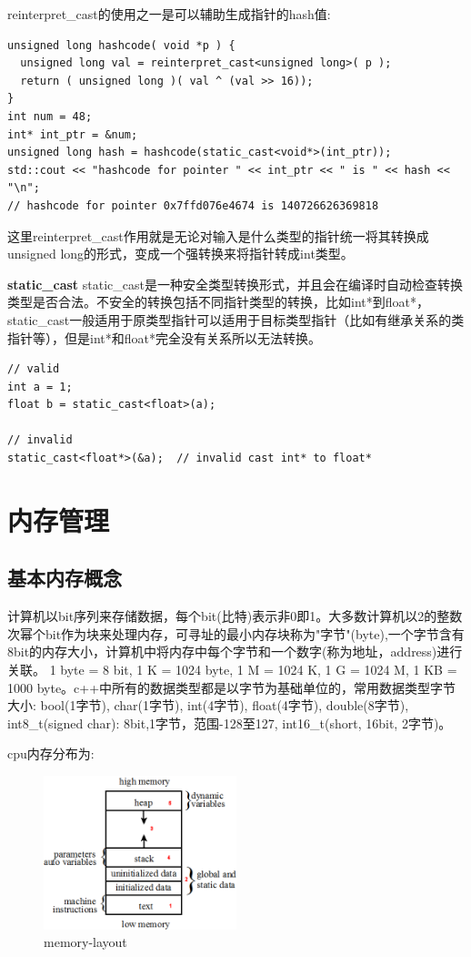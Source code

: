 \documentclass[12pt]{book}
\begin{document}
reinterpret\_cast的使用之一是可以辅助生成指针的hash值:
\begin{lstlisting}
unsigned long hashcode( void *p ) {
  unsigned long val = reinterpret_cast<unsigned long>( p );
  return ( unsigned long )( val ^ (val >> 16));
}
int num = 48;
int* int_ptr = &num;
unsigned long hash = hashcode(static_cast<void*>(int_ptr));
std::cout << "hashcode for pointer " << int_ptr << " is " << hash << "\n";
// hashcode for pointer 0x7ffd076e4674 is 140726626369818
\end{lstlisting}
这里reinterpret\_cast作用就是无论对输入是什么类型的指针统一将其转换成unsigned long的形式，变成一个强转换来将指针转成int类型。

\textbf{static\_cast} \newline
static\_cast是一种安全类型转换形式，并且会在编译时自动检查转换类型是否合法。不安全的转换包括不同指针类型的转换，比如int*到float*，static\_cast一般适用于原类型指针可以适用于目标类型指针（比如有继承关系的类指针等），但是int*和float*完全没有关系所以无法转换。
\begin{lstlisting}
// valid
int a = 1;
float b = static_cast<float>(a);

// invalid
static_cast<float*>(&a);  // invalid cast int* to float*
\end{lstlisting}

\section{内存管理}
\subsection{基本内存概念}
计算机以bit序列来存储数据，每个bit(比特)表示非0即1。大多数计算机以2的整数次幂个bit作为块来处理内存，可寻址的最小内存块称为"字节"(byte),一个字节含有8bit的内存大小，计算机中将内存中每个字节和一个数字(称为地址，address)进行关联。
1 byte = 8 bit, 1 K = 1024 byte, 1 M = 1024 K, 1 G = 1024 M, 1 KB = 1000 byte。c++中所有的数据类型都是以字节为基础单位的，常用数据类型字节大小: bool(1字节), char(1字节), int(4字节), float(4字节), double(8字节), int8\_t(signed char): 8bit,1字节，范围-128至127, int16\_t(short, 16bit, 2字节)。\newline

cpu内存分布为:
\begin{figure}[H]
\centering
\includegraphics[width=0.5\textwidth]{images/memory_layout.png}
\caption{memory-layout}
\label{memory-layout}
\end{figure}
\end{document}
